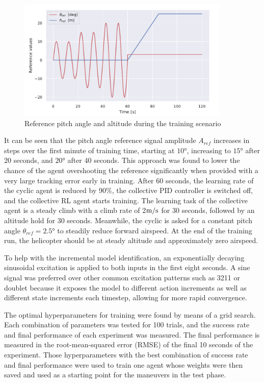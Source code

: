 \begin{figure}[ht]
    \centering
    \includegraphics[width=0.9\textwidth]{fig/4/reference_training.pdf}
    \caption[]{Reference pitch angle and altitude during the training scenario}
    \label{fig:reference_training}
\end{figure}

It can be seen that the pitch angle reference signal amplitude $A_{ref}$ increases in steps over the first minute of training time, starting at $10\si{\degree}$, increasing to $15\si{\degree}$ after 20 seconds, and $20\si{\degree}$ after 40 seconds. This approach was found to lower the chance of the agent overshooting the reference significantly when provided with a very large tracking error early in training.
After 60 seconds, the learning rate of the cyclic agent is reduced by 90\%, the collective PID controller is switched off, and the collective RL agent starts training. The learning task of the collective agent is a steady climb with a climb rate of 2$\si[per-mode=symbol]{\meter \per \second}$ for 30 seconds, followed by an altitude hold for 30 seconds. Meanwhile, the cyclic is asked for a constant pitch angle $\theta_{ref} = 2.5\si{\degree}$ to steadily reduce forward airspeed. At the end of the training run, the helicopter should be at steady altitude and approximately zero airspeed. 

To help with the incremental model identification, an exponentially decaying sinusoidal excitation is applied to both inputs in the first eight seconds. A sine signal was preferred over other common excitation patterns such as 3211 or doublet because it exposes the model to different action increments as well as different state increments each timestep, allowing for more rapid convergence. 

The optimal hyperparameters for training were found by means of a grid search. Each combination of parameters was tested for 100 trials, and the success rate and final performance of each experiment was measured. The final performance is measured in the root-mean-squared error (RMSE) of the final 10 seconds of the experiment. Those hyperparameters with the best combination of success rate and final performance were used to train one agent whose weights were then saved and used as a starting point for the maneuvers in the test phase.

